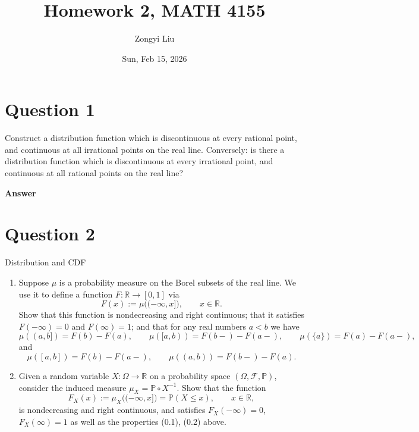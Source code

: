 \documentclass[letterpaper]{article}
\title{Homework 2, MATH 4155}
\author{Zongyi Liu}
\date{Sun, Feb 15, 2026}
\begin{document}
		\maketitle
		
		\section{Question 1}
		
		Construct a distribution function which is discontinuous at every rational point, and continuous at all irrational points on the real line. Conversely: is there a distribution function which is discontinuous at every irrational point, and continuous at all rational points on the real line?
		
		\textbf{Answer}
		
		\clearpage
		
	
	\section{Question 2}
	
	{\color{deepred} Distribution and CDF}
	
	\begin{enumerate}
		
		
		
		\item[(i)] Suppose $\mu$ is a probability measure on the Borel subsets of the real line.
		We use it to define a function $F : \mathbb{R} \to [0,1]$ via
		\[
		F(x) := \mu\bigl((-\infty,x]\bigr), \qquad x \in \mathbb{R}.
		\]
		Show that this function is nondecreasing and right continuous; that it satisfies
		$F(-\infty)=0$ and $F(\infty)=1$; and that for any real numbers $a<b$ we have
		\begin{equation}
			\mu((a,b]) = F(b)-F(a), \qquad
			\mu([a,b)) = F(b-)-F(a-), \qquad
			\mu(\{a\}) = F(a)-F(a-),
			\tag{0.1}
		\end{equation}
		and
		\begin{equation}
			\mu([a,b]) = F(b)-F(a-), \qquad
			\mu((a,b)) = F(b-)-F(a).
			\tag{0.2}
		\end{equation}
		
		\item[(ii)] Given a random variable $X:\Omega \to \mathbb{R}$ on a probability space
		$(\Omega,\mathcal{F},\mathbb{P})$, consider the induced measure
		$\mu_X = \mathbb{P}\circ X^{-1}$.
		Show that the function
		\[
		F_X(x) := \mu_X\bigl((-\infty,x]\bigr) = \mathbb{P}(X \le x),
		\qquad x \in \mathbb{R},
		\]
		is nondecreasing and right continuous, and satisfies
		$F_X(-\infty)=0$, $F_X(\infty)=1$ as well as the properties
		\textup{(0.1)}, \textup{(0.2)} above.
	\end{enumerate}
		
\end{document}
